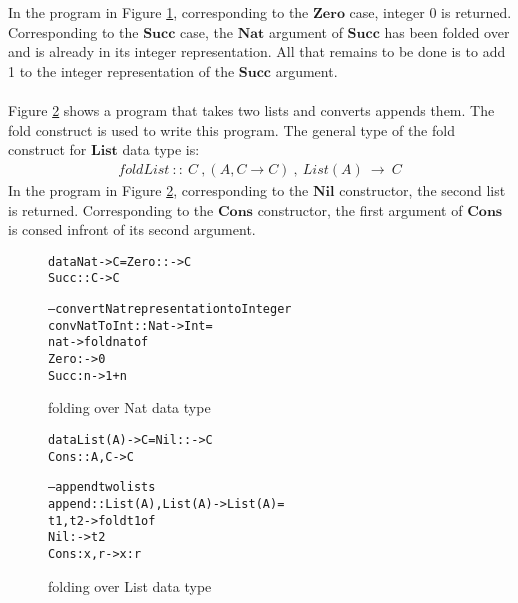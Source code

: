 \documentclass[11pt]{article}
\begin{document}
~~\\~~\\ 
In the program in Figure \ref {seqMPL:foldExampleFst}, corresponding to the $\mathbf{Zero}$ case, integer 0 is returned. Corresponding to the $\mathbf{Succ}$ case, the $\mathbf{Nat}$ argument of $\mathbf{Succ}$ has been folded over and is already in its integer representation. All that remains to be done is to add 1 to the integer representation of the $\mathbf{Succ}$ argument.
~~\\~~\\ 
Figure \ref {seqMPL:foldExampleSnd} shows a program that takes two lists and converts appends them. The {\sf fold} construct is used to write this program. The general type of the {\sf fold} construct for $\mathbf{List}$ data type is:
\begin{align*}
  foldList~::~C~,(A,C \to C)~,~ List(A) ~\to~ C
\end{align*}
In the program in Figure \ref {seqMPL:foldExampleSnd}, corresponding to the  $\mathbf{Nil}$ constructor, the second list is returned. Corresponding to the $\mathbf{Cons}$ constructor, the first argument of $\mathbf{Cons}$ is consed infront of its second argument.

\begin{figure}[!h]
\begin{alltt}

                data Nat -> C = Zero ::   -> C 
                                Succ :: C -> C

                -- convert Nat representation to Integer
                convNatToInt:: Nat -> Int =
                  nat -> fold nat of
                           Zero :   -> 0
                           Succ : n -> 1 + n 
\end{alltt} 
\caption{folding over Nat data type}
\label{seqMPL:foldExampleFst}
\end{figure} 

\begin{figure}[!h]
\begin{alltt}

                data List(A) -> C = Nil  ::     -> C 
                                    Cons :: A,C -> C

                -- append two lists
                append :: List(A),List(A) -> List(A) =
                  t1,t2 -> fold t1 of
                             Nil  :    -> t2
                             Cons :x,r -> x:r
\end{alltt} 
\caption{folding over List data type}
\label{seqMPL:foldExampleSnd}
\end{figure} 
\end{document}
